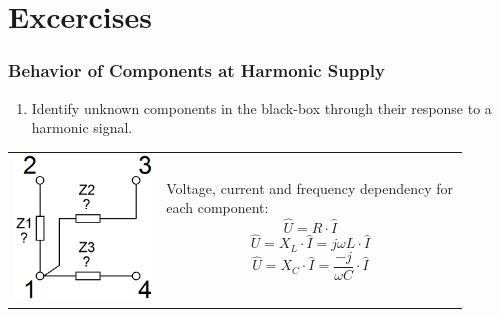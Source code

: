 \documentclass{beamer}
\begin{document}
\section{\texorpdfstring{Excercises}{Excercises}}
	\begin{frame}
    \frametitle{Behavior of Components at Harmonic Supply}
		\begin{enumerate}
			\setcounter{enumi}{0}
			\item Identify unknown components in the black-box through their response to a harmonic signal.
		\end{enumerate}
		
		\begin{center}
			\begin{tabular}{m{0.3\linewidth} m{0.6\linewidth}}
			\includegraphics[scale=0.25]{obr02_identifikaceZ.png} &
			Voltage, current and frequency dependency for each component:
			$$\hat{U}=R \cdot \hat{I}$$
			$$\hat{U}=X_L \cdot \hat{I} = j\omega L \cdot\hat{I}$$
			$$\hat{U}=X_C \cdot \hat{I} = \frac{-j}{\omega C}\cdot\hat{I}$$
			\end{tabular}
		\end{center}
	\end{frame}
\end{document}
